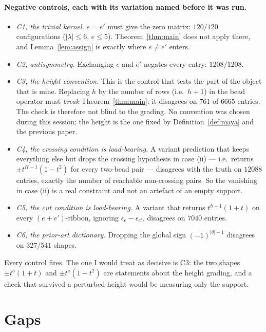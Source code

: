 \documentclass[11pt]{article}
\theoremstyle{definition}
\begin{document}
\paragraph{Negative controls, each with its variation named before it was run.}
\begin{itemize}
\item \emph{C1, the trivial kernel.} $e=e'$ must give the zero matrix: $120/120$ configurations
($|\lambda|\le6$, $e\le5$). Theorem~\ref{thm:main} does not apply there, and
Lemma~\ref{lem:assign} is exactly where $e\ne e'$ enters.
\item \emph{C2, antisymmetry.} Exchanging $e$ and $e'$ negates every entry: $1208/1208$.
\item \emph{C3, the height convention.} This is the control that tests the part of the object
that is mine. Replacing $h$ by the number of rows (i.e.\ $h+1$) in the bead operator must
\emph{break} Theorem~\ref{thm:main}: it disagrees on $761$ of $6665$ entries. The check is
therefore not blind to the grading. No convention was chosen during this session; the height is
the one fixed by Definition~\ref{def:maya} and the previous paper.
\item \emph{C4, the crossing condition is load-bearing.} A variant prediction that keeps
everything else but drops the crossing hypothesis in case (ii) --- i.e.\ returns
$\pm t^{H-1}(1-t^2)$ for every two-bead pair --- disagrees with the truth on $12088$ entries,
exactly the number of reachable non-crossing pairs. So the vanishing in case (ii) is a real
constraint and not an artefact of an empty support.
\item \emph{C5, the cut condition is load-bearing.} A variant that returns $t^{h-1}(1+t)$ on
every $(e+e')$-ribbon, ignoring $\epsilon_e-\epsilon_{e'}$, disagrees on $7040$ entries.
\item \emph{C6, the prior-art dictionary.} Dropping the global sign $(-1)^{|\theta|-1}$
disagrees on $327/541$ shapes.
\end{itemize}
Every control fires. The one I would treat as decisive is C3: the two shapes $\pm t^a(1+t)$ and
$\pm t^a(1-t^2)$ are statements about the height grading, and a check that survived a perturbed
height would be measuring only the support.

\section{Gaps}
\end{document}
